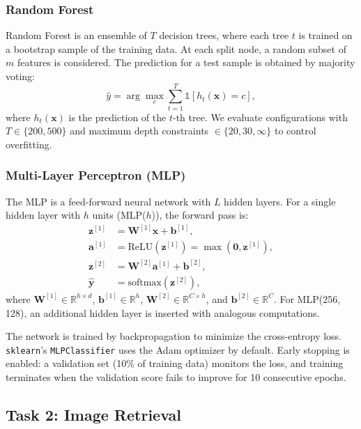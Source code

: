 \documentclass[onecolumn,a4paper,12pt]{IEEEtran}
\begin{document}
\subsubsection{Random Forest}

Random Forest is an ensemble of $T$ decision trees, where each tree $t$ is trained on a bootstrap sample of the training data. At each split node, a random subset of $m$ features is considered. The prediction for a test sample is obtained by majority voting:
\begin{equation}
\hat{y} = \arg\max_{c} \sum_{t=1}^{T} \mathbb{1}[h_t(\mathbf{x}) = c],
\end{equation}
where $h_t(\mathbf{x})$ is the prediction of the $t$-th tree. We evaluate configurations with $T \in \{200, 500\}$ and maximum depth constraints $\in \{20, 30, \infty\}$ to control overfitting.

\subsubsection{Multi-Layer Perceptron (MLP)}

The MLP is a feed-forward neural network with $L$ hidden layers. For a single hidden layer with $h$ units (MLP($h$)), the forward pass is:
\begin{align}
\mathbf{z}^{[1]} &= \mathbf{W}^{[1]} \mathbf{x} + \mathbf{b}^{[1]}, \\
\mathbf{a}^{[1]} &= \text{ReLU}(\mathbf{z}^{[1]}) = \max(\mathbf{0}, \mathbf{z}^{[1]}), \\
\mathbf{z}^{[2]} &= \mathbf{W}^{[2]} \mathbf{a}^{[1]} + \mathbf{b}^{[2]}, \\
\hat{\mathbf{y}} &= \text{softmax}(\mathbf{z}^{[2]}),
\end{align}
where $\mathbf{W}^{[1]} \in \mathbb{R}^{h \times d}$, $\mathbf{b}^{[1]} \in \mathbb{R}^h$, $\mathbf{W}^{[2]} \in \mathbb{R}^{C \times h}$, and $\mathbf{b}^{[2]} \in \mathbb{R}^C$. For MLP(256, 128), an additional hidden layer is inserted with analogous computations.

The network is trained by backpropagation to minimize the cross-entropy loss. \texttt{sklearn}'s \texttt{MLPClassifier} uses the Adam optimizer by default. Early stopping is enabled: a validation set (10\% of training data) monitors the loss, and training terminates when the validation score fails to improve for 10 consecutive epochs.

\subsection{Task 2: Image Retrieval}
\end{document}
